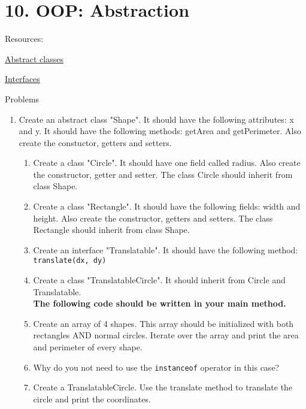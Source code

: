 \documentclass[12pt,letterpaper]{article}
\newcommand\hwnumber{10}
\begin{document}
\section*{\hwnumber. OOP: Abstraction}
Resources:
\begin{description}
    \item \href{https://www.w3schools.com/java/java_abstract.asp}{Abstract classes}
    \item \href{https://www.w3schools.com/java/java_interface.asp}{Interfaces}
\end{description}


Problems
\begin{enumerate}
\item
Create an abstract class "Shape". 
It should have the following attributes: x and y.
It should have the following methods: getArea and getPerimeter.
Also create the constuctor, getters and setters.
\begin{enumerate}
\item
Create a class "Circle". It should have one field called radius. Also create the constructor, getter and setter. The class Circle should inherit from class Shape.

\item
Create a class "Rectangle". It should have the following fields: width and height. Also create the constructor, getters and setters. The class Rectangle should inherit from class Shape.

\item
Create an interface "Translatable". It should have the following method:\\ \lstinline[]$translate(dx, dy)$

\item
Create a class "TranslatableCircle". It should inherit from Circle and Translatable. \\

\textbf{The following code should be written in your main method.}
\item
Create an array of 4 shapes. This array should be initialized with both rectangles AND normal circles. Iterate over the array and print the area and perimeter of every shape.

\item
Why do you not need to use the \lstinline[]$instanceof$ operator in this case?

\item
Create a TranslatableCircle. Use the translate method to translate the circle and print the coordinates.


\end{enumerate}
\end{enumerate}
\end{document}
